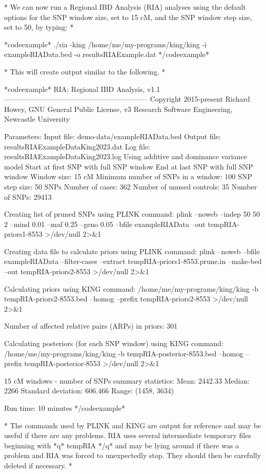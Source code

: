 *
We can now run a Regional IBD Analysis (RIA) analyses using the default options for the SNP window size, set to 15 cM, and the SNP window step size, set to 50, by typing:
*

*codeexample*
./ria -king /home/me/my-programs/king/king -i exampleRIAData.bed -o resultsRIAExample.dat
*/codeexample*

*
This will create output similar to the following.
*

*codeexample*
RIA: Regional IBD Analysis, v1.1
------------------------------------------------------------
Copyright 2015-present Richard Howey, GNU General Public License, v3
Research Software Engineering, Newcastle University

Parameters:
Input file: demo-data/exampleRIAData.bed
Output file: resultsRIAExampleDataKing2023.dat
Log file: resultsRIAExampleDataKing2023.log
Using additive and dominance variance model
Start at first SNP with full SNP window
End at last SNP with full SNP window
Window size: 15 cM
Minimum number of SNPs in a window: 100
SNP step size: 50 SNPs
Number of cases: 362
Number of unused controls: 35
Number of SNPs: 29413

Creating list of pruned SNPs using PLINK command:
plink --noweb --indep 50 50 2 --mind 0.01 --maf 0.25 --geno 0.05 --bfile exampleRIAData --out tempRIA-priors1-8553 >/dev/null 2>&1

Creating data file to calculate priors using PLINK command:
plink --noweb --bfile exampleRIAData --filter-cases --extract tempRIA-priors1-8553.prune.in --make-bed --out tempRIA-priors2-8553 >/dev/null 2>&1

Calculating priors using KING command:
/home/me/my-programs/king/king -b tempRIA-priors2-8553.bed --homog --prefix tempRIA-priors2-8553 >/dev/null 2>&1

Number of affected relative pairs (ARPs) in priors: 301

Calculating posteriors (for each SNP window) using KING command:
/home/me/my-programs/king/king -b tempRIA-posterior-8553.bed --homog --prefix tempRIA-posterior-8553 >/dev/null 2>&1

15 cM windows - number of SNPs summary statistics:
Mean: 2442.33
Median: 2266
Standard deviation: 606.466
Range: (1458, 3634)

Run time: 10 minutes
*/codeexample*

*
The commands used by PLINK and KING are output for reference and may be useful if there are any problems. RIA uses several intermediate temporary files beginning with *q* tempRIA */q* and may be lying around if there was a problem and RIA was forced to unexpectedly stop. They should then be carefully deleted if necessary.
*

